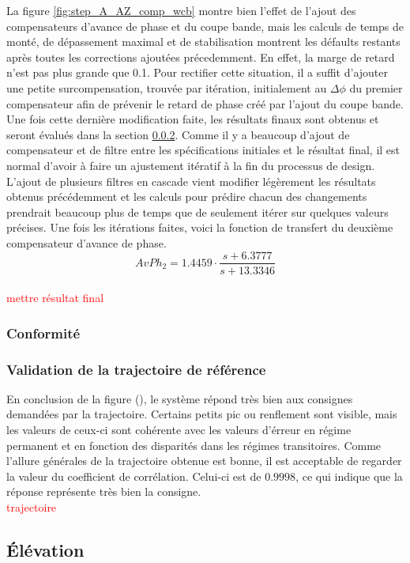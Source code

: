 \documentclass{udes_rapport} %
\begin{document}
La figure \ref{fig:step_A_AZ_comp_wcb} montre bien l'effet de l'ajout des compensateurs d'avance de phase et du coupe bande, mais les calculs de temps de monté, de dépassement maximal et de stabilisation montrent les défaults restants après toutes les corrections ajoutées précedemment. En effet, la marge de retard n'est pas plus grande que 0.1. Pour rectifier cette situation, il a suffit d'ajouter une petite surcompensation, trouvée par itération, initialement au $\Delta \phi$ du premier compensateur afin de prévenir le retard de phase créé par l'ajout du coupe bande. Une fois cette dernière modification faite, les résultats finaux sont obtenus et seront évalués dans la section \ref{valid_AZ_A}. Comme il y a beaucoup d'ajout de compensateur et de filtre entre les spécifications initiales et le résultat final, il est normal d'avoir à faire un ajustement itératif à la fin du processus de design. L'ajout de plusieurs filtres en cascade vient modifier légèrement les résultats obtenus précédemment et les calculs pour prédire chacun des changements prendrait beaucoup plus de temps que de seulement itérer sur quelques valeurs précises. Une fois les itérations faites, voici la fonction de transfert du deuxième compensateur d'avance de phase.
\[ AvPh_2 =  1.4459 \cdot \frac{s+6.3777}{s+13.3346}\]
\\
\textcolor{red}{mettre résultat final}
\\
\subsubsection{Conformité}
\subsubsection{Validation de la trajectoire de référence} \label{valid_AZ_A}
En conclusion de la figure (), le système répond très bien aux consignes demandées par la trajectoire. Certains petits pic ou renflement sont visible, mais les valeurs de ceux-ci sont cohérente avec les valeurs d'érreur en régime permanent et en fonction des disparités dans les régimes transitoires. Comme l'allure générales de la trajectoire obtenue est bonne, il est acceptable de regarder la valeur du coefficient de corrélation. Celui-ci est de $0.9998$, ce qui indique que la réponse représente très bien la consigne.
\\
\textcolor{red}{trajectoire}
\\
\subsection{Élévation}
\end{document}
